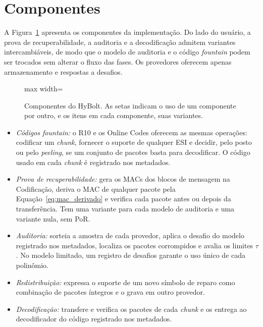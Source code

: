 \section{Componentes}

A Figura~\ref{fig:componentes} apresenta os componentes da implementação. Do lado do usuário, a prova de recuperabilidade, a auditoria e a decodificação admitem variantes intercambiáveis, de modo que o modelo de auditoria e o código \emph{fountain} podem ser trocados sem alterar o fluxo das fases. Os provedores oferecem apenas armazenamento e respostas a desafios.

\begin{figure}[htbp]
	\centering
	\begin{adjustbox}{max width=\textwidth}
		
	\end{adjustbox}
	\caption{Componentes do HyBolt. As setas indicam o uso de um componente por outro, e os itens em cada componente, suas variantes.}
	\label{fig:componentes}
\end{figure}

\begin{itemize}
	\item \textit{Códigos fountain:} o R10 e os Online Codes oferecem as mesmas operações: codificar um \emph{chunk}, fornecer o suporte de qualquer \acrshort{ESI} e decidir, pelo posto ou pelo \emph{peeling}, se um conjunto de pacotes basta para decodificar. O código usado em cada \emph{chunk} é registrado nos metadados.
	\item \textit{Prova de recuperabilidade:} gera os \acrshort{MAC}s dos blocos de mensagem na Codificação, deriva o \acrshort{MAC} de qualquer pacote pela Equação~\eqref{eq:mac_derivado} e verifica cada pacote antes ou depois da transferência. Tem uma variante para cada modelo de auditoria e uma variante nula, sem \acrshort{PoR}.
	\item \textit{Auditoria:} sorteia a amostra de cada provedor, aplica o desafio do modelo registrado nos metadados, localiza os pacotes corrompidos e avalia os limites $\tau$. No modelo limitado, um registro de desafios garante o uso único de cada polinômio.
	\item \textit{Redistribuição:} expressa o suporte de um novo símbolo de reparo como combinação de pacotes íntegros e o grava em outro provedor.
	\item \textit{Decodificação:} transfere e verifica os pacotes de cada \emph{chunk} e os entrega ao decodificador do código registrado nos metadados.
\end{itemize}

